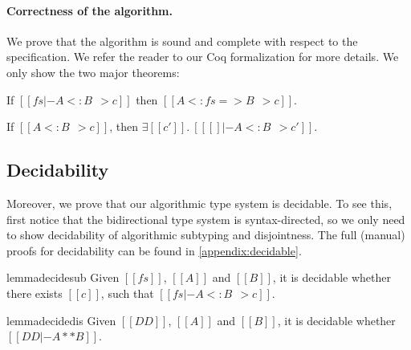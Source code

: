 \paragraph{Correctness of the algorithm.}

We prove that the algorithm is sound and complete with respect to the
specification. We refer the reader to our Coq formalization for more details.
We only show the two major theorems:

\begin{theorem}[Soundness]
  If $[[ fs |- A <: B ~~> c]]$ then $ [[   A <: fs => B ~~> c  ]]   $.
\end{theorem}

\begin{theorem}[Completeness]
  If $[[A <: B ~~> c]]$, then $\exists [[c']].\ [[ [] |- A <: B ~~> c']]$.
\end{theorem}


\subsection{Decidability}

Moreover, we prove that our algorithmic type system is decidable. To see this,
first notice that the bidirectional type system is syntax-directed, so we only
need to show decidability of algorithmic subtyping and
disjointness. The full (manual) proofs for decidability can be found in
\cref{appendix:decidable}.

\begin{restatable}{lemma}{decidesub} \label{lemma:decide-sub}
  Given $[[fs]]$, $[[A]]$ and $[[B]]$, it is decidable whether there exists
  $[[c]]$, such that $[[fs |- A <: B ~~> c]]$.
\end{restatable}

\begin{restatable}{lemma}{decidedis} \label{lemma:decide-dis}
  Given $[[DD]]$, $[[A]]$ and $[[B]]$, it is decidable whether $[[ DD |- A ** B ]]$.
\end{restatable}



